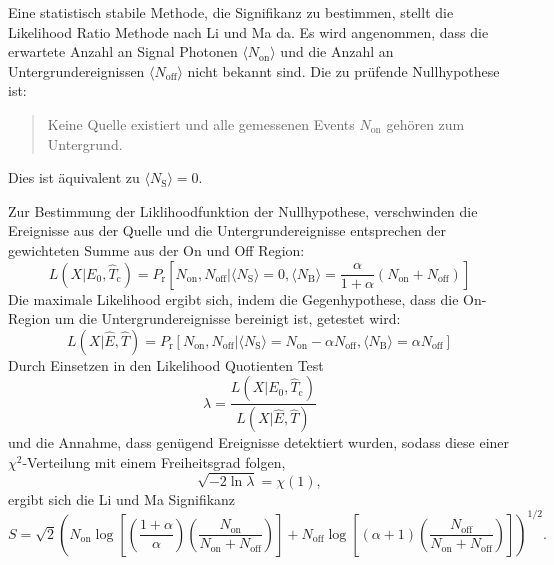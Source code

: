 Eine statistisch stabile Methode, die Signifikanz zu bestimmen, stellt die
Likelihood Ratio Methode nach Li und Ma da.
Es wird angenommen, dass die erwartete Anzahl an Signal
Photonen $\langle N_\text{on} \rangle$ und die Anzahl an Untergrundereignissen
$\langle N_\text{off} \rangle$ nicht bekannt sind.
Die zu prüfende Nullhypothese ist:
\begin{quote}
	Keine Quelle existiert und
    alle gemessenen Events $N_\text{on}$ gehören zum Untergrund.
\end{quote}
Dies ist äquivalent zu $\langle N_\text{S} \rangle=0$.

Zur Bestimmung der Liklihoodfunktion der Nullhypothese,
verschwinden die
Ereignisse aus der Quelle und die Untergrundereignisse entsprechen der
gewichteten Summe aus der On und Off Region:
\begin{equation}
	L(X|E_0, \hat{T}_\text{c})= P_\text{r} \left[
		N_\text{on}, N_\text{off} |
		\langle N_\text{S} \rangle = 0,
		\langle N_\text{B} \rangle = \frac{\alpha}{1 + \alpha} (N_\text{on} +
			N_\text{off})
	\right]
\end{equation}
Die maximale Likelihood ergibt sich,
indem die Gegenhypothese,
dass die On-Region um die Untergrundereignisse bereinigt ist,
getestet wird:
\begin{equation}
	L(X|\hat{E}, \hat{T})= P_\text{r} \left[
		N_\text{on}, N_\text{off} |
		\langle N_\text{S} \rangle = N_\text{on} - \alpha N_\text{off},
		\langle N_\text{B} \rangle = \alpha N_\text{off}
	\right]
\end{equation}
Durch Einsetzen in den Likelihood Quotienten Test
\begin{equation}
	\lambda = \frac{L(X|E_0, \hat{T}_\text{c})}{L(X|\hat{E}, \hat{T})}
\end{equation}
und die Annahme, dass genügend Ereignisse detektiert wurden, sodass diese einer
$\chi^2$-Verteilung mit einem Freiheitsgrad folgen,
\begin{equation}
	\sqrt{- 2 \ln \lambda} = \chi(1),
\end{equation}
ergibt sich die Li und Ma Signifikanz
\begin{equation}
  S = \sqrt{2} {\left(
      N_\text{on} \log \left[
        \left( \frac{1 + \alpha}{\alpha} \right) \left(
          \frac{N_\text{on}}{N_\text{on} + N_\text{off}}
        \right)
      \right]
      + N_\text{off} \log \left[
        (\alpha + 1) \left(
          \frac{N_\text{off}}{N_\text{on} + N_\text{off}}
        \right)
      \right]
  \right)} ^ {1/2}.
\end{equation}

